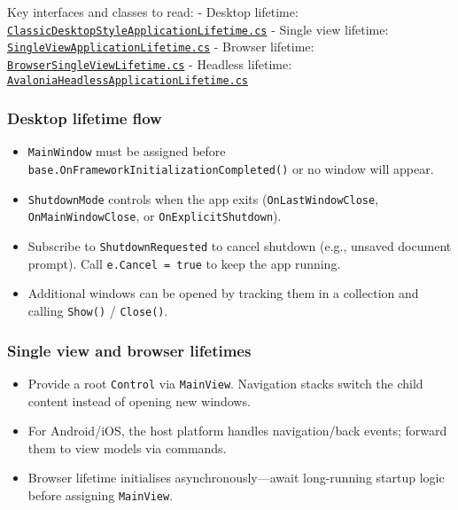 Key interfaces and classes to read: - Desktop lifetime:
\href{https://github.com/AvaloniaUI/Avalonia/blob/master/src/Avalonia.Controls/ApplicationLifetimes/ClassicDesktopStyleApplicationLifetime.cs}{\passthrough{\lstinline!ClassicDesktopStyleApplicationLifetime.cs!}}
- Single view lifetime:
\href{https://github.com/AvaloniaUI/Avalonia/blob/master/src/Avalonia.Controls/ApplicationLifetimes/SingleViewApplicationLifetime.cs}{\passthrough{\lstinline!SingleViewApplicationLifetime.cs!}}
- Browser lifetime:
\href{https://github.com/AvaloniaUI/Avalonia/blob/master/src/Browser/Avalonia.Browser/BrowserSingleViewLifetime.cs}{\passthrough{\lstinline!BrowserSingleViewLifetime.cs!}}
- Headless lifetime:
\href{https://github.com/AvaloniaUI/Avalonia/blob/master/src/Headless/Avalonia.Headless/AvaloniaHeadlessApplicationLifetime.cs}{\passthrough{\lstinline!AvaloniaHeadlessApplicationLifetime.cs!}}

\subsubsection{Desktop lifetime flow}\label{desktop-lifetime-flow}

\begin{itemize}
\tightlist
\item
  \passthrough{\lstinline!MainWindow!} must be assigned before
  \passthrough{\lstinline!base.OnFrameworkInitializationCompleted()!} or
  no window will appear.
\item
  \passthrough{\lstinline!ShutdownMode!} controls when the app exits
  (\passthrough{\lstinline!OnLastWindowClose!},
  \passthrough{\lstinline!OnMainWindowClose!}, or
  \passthrough{\lstinline!OnExplicitShutdown!}).
\item
  Subscribe to \passthrough{\lstinline!ShutdownRequested!} to cancel
  shutdown (e.g., unsaved document prompt). Call
  \passthrough{\lstinline!e.Cancel = true!} to keep the app running.
\item
  Additional windows can be opened by tracking them in a collection and
  calling \passthrough{\lstinline!Show()!} /
  \passthrough{\lstinline!Close()!}.
\end{itemize}

\subsubsection{Single view and browser
lifetimes}\label{single-view-and-browser-lifetimes}

\begin{itemize}
\tightlist
\item
  Provide a root \passthrough{\lstinline!Control!} via
  \passthrough{\lstinline!MainView!}. Navigation stacks switch the child
  content instead of opening new windows.
\item
  For Android/iOS, the host platform handles navigation/back events;
  forward them to view models via commands.
\item
  Browser lifetime initialises asynchronously---await long-running
  startup logic before assigning \passthrough{\lstinline!MainView!}.
\end{itemize}

